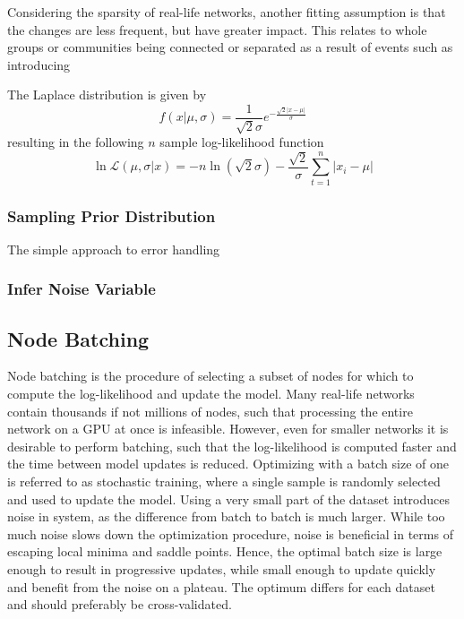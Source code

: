     Considering the sparsity of real-life networks, another fitting assumption is that the changes are less frequent, but have greater impact. This relates to whole groups or communities being connected or separated as a result of events such as introducing 
    

    The Laplace distribution is given by
    \begin{equation}
        f(x\vert\mu,\sigma)=\frac{1}{\sqrt{2}\sigma}e^{-\frac{\sqrt{2}|x-\mu|}{\sigma}}
    \end{equation}
    resulting in the following $n$ sample log-likelihood function
    \begin{equation}
        \ln\mathcal{L}(\mu,\sigma\vert x)=-n\ln(\sqrt{2}\sigma) -\frac{\sqrt{2}}{\sigma}\sum_{t=1}^n |x_i-\mu|
    \end{equation}
    
    
    \subsubsection{Sampling Prior Distribution}
    
        The simple approach to error handling
    
    \subsubsection{Infer Noise Variable}
    
\subsection{Node Batching}

    Node batching is the procedure of selecting a subset of nodes for which to compute the log-likelihood and update the model. Many real-life networks contain thousands if not millions of nodes, such that processing the entire network on a GPU at once is infeasible. However, even for smaller networks it is desirable to perform batching, such that the log-likelihood is computed faster and the time between model updates is reduced. Optimizing with a batch size of one is referred to as stochastic training, where a single sample is randomly selected and used to update the model. Using a very small part of the dataset introduces noise in system, as the difference from batch to batch is much larger. While too much noise slows down the optimization procedure, noise is beneficial in terms of escaping local minima and saddle points. Hence, the optimal batch size is large enough to result in progressive updates, while small enough to update quickly and benefit from the noise on a plateau. The optimum differs for each dataset and should preferably be cross-validated.
    

